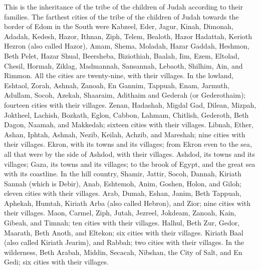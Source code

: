  This is the inheritance of the tribe of the children of
Judah according to their families.  The farthest cities
of the tribe of the children of Judah towards the border of Edom in the
South were Kabzeel, Eder, Jagur,  Kinah, Dimonah, Adadah,
 Kedesh, Hazor, Ithnan,  Ziph, Telem,
Bealoth,  Hazor Hadattah, Kerioth Hezron (also called
Hazor),  Amam, Shema, Moladah,  Hazar
Gaddah, Heshmon, Beth Pelet,  Hazar Shual, Beersheba,
Biziothiah,  Baalah, Iim, Ezem,  Eltolad,
Chesil, Hormah,  Ziklag, Madmannah, Sansannah,
 Lebaoth, Shilhim, Ain, and Rimmon. All the cities are
twenty-nine, with their villages.  In the lowland,
Eshtaol, Zorah, Ashnah,  Zanoah, En Gannim, Tappuah,
Enam,  Jarmuth, Adullam, Socoh, Azekah, 
Shaaraim, Adithaim and Gederah (or Gederothaim); fourteen cities with
their villages.  Zenan, Hadashah, Migdal Gad,
 Dilean, Mizpah, Joktheel,  Lachish,
Bozkath, Eglon,  Cabbon, Lahmam, Chitlish,
 Gederoth, Beth Dagon, Naamah, and Makkedah; sixteen
cities with their villages.  Libnah, Ether, Ashan,
 Iphtah, Ashnah, Nezib,  Keilah, Achzib,
and Mareshah; nine cities with their villages.  Ekron,
with its towns and its villages;  from Ekron even to the
sea, all that were by the side of Ashdod, with their villages.
 Ashdod, its towns and its villages; Gaza, its towns and
its villages; to the brook of Egypt, and the great sea with its
coastline.  In the hill country, Shamir, Jattir, Socoh,
 Dannah, Kiriath Sannah (which is Debir), 
Anab, Eshtemoh, Anim,  Goshen, Holon, and Giloh; eleven
cities with their villages.  Arab, Dumah, Eshan,
 Janim, Beth Tappuah, Aphekah,  Humtah,
Kiriath Arba (also called Hebron), and Zior; nine cities with their
villages.  Maon, Carmel, Ziph, Jutah, 
Jezreel, Jokdeam, Zanoah,  Kain, Gibeah, and Timnah; ten
cities with their villages.  Halhul, Beth Zur, Gedor,
 Maarath, Beth Anoth, and Eltekon; six cities with their
villages.  Kiriath Baal (also called Kiriath Jearim), and
Rabbah; two cities with their villages.  In the
wilderness, Beth Arabah, Middin, Secacah,  Nibshan, the
City of Salt, and En Gedi; six cities with their villages.

